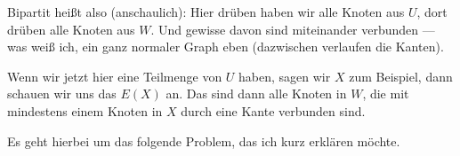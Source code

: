 \begin{spoken-clean}[01:03:23 - 01:04:39]
Bipartit heißt also (anschaulich): Hier drüben haben wir alle Knoten aus $U$, dort drüben alle Knoten aus $W$.  Und gewisse davon sind miteinander verbunden --- was weiß ich, ein ganz normaler Graph eben (dazwischen verlaufen die Kanten).

Wenn wir jetzt hier eine Teilmenge von $U$ haben, sagen wir $X$ zum Beispiel, dann schauen wir uns das $E(X)$ an. Das sind dann alle Knoten in $W$, die mit mindestens einem Knoten in $X$ durch eine Kante verbunden sind.

Es geht hierbei um das folgende Problem, das ich kurz erklären möchte. 
\end{spoken-clean}

